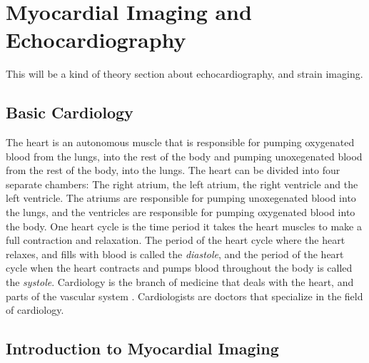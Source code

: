 \chapter{Myocardial Imaging and Echocardiography} \label{chap:strain}
\begin{comment}
[ ] Short about cardiology and echocardiography history
[ ] Short about the heart, and its anatomy
[ ] Even shorter about ultrasound, the different views, and what parts of the heart can be seen in them.
[ ] Method for extracting strain curves from ultrasound videos.
[ ] Explain the different diagnosises that will be encountered in this thesis.
[ ] Explain anatomical reasoning for why symptoms for certain diagnosis are evident in strain curves.
[ ] Summarize chapter
\end{comment}

This will be a kind of theory section about echocardiography, and strain imaging. \bigskip

\section{Basic Cardiology}
\begin{comment}
[ ] Short about cardiology and echocardiography history
[ ] Short about the heart, and its anatomy
\end{comment}
The heart is an autonomous muscle that is responsible for pumping oxygenated blood from the lungs, into the rest of the body and pumping unoxegenated blood from the rest of the body, into the lungs. The heart can be divided into four separate chambers: The right atrium, the left atrium, the right ventricle and the left ventricle. The atriums are responsible for pumping unoxegenated blood into the lungs, and the ventricles are responsible for pumping oxygenated blood into the body. One heart cycle is the time period it takes the heart muscles to make a full contraction and relaxation. The period of the heart cycle where the heart relaxes, and fills with blood is called the \textit{diastole}, and the period of the heart cycle when the heart contracts and pumps blood throughout the body is called the \textit{systole}. Cardiology is the branch of medicine that deals with the heart, and parts of the vascular system \cite{cardiology_wikipedia}. Cardiologists are doctors that specialize in the field of cardiology. 

\section{Introduction to Myocardial Imaging}
\begin{comment}
[ ] Even shorter about ultrasound, the different views, and what parts of the heart can be seen in them.
\end{comment}

